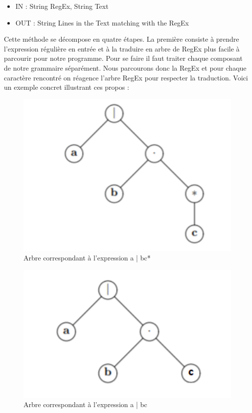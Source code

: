 \documentclass{article}
\begin{document}
\begin{itemize}
\item IN : String RegEx, String Text
\item OUT : String Lines in the Text matching with the RegEx\\
\end{itemize}

Cette méthode se décompose en quatre étapes. La première consiste à prendre l’expression régulière en entrée et à la traduire en arbre de RegEx plus facile à parcourir pour notre programme. Pour se faire il faut traiter chaque composant de notre grammaire séparément. Nous parcourons donc la RegEx et pour chaque caractère
rencontré on réagence l’arbre RegEx pour respecter la traduction. Voici un exemple concret illustrant ces propos :

\begin{figure}[!h]
  \centering
  \includegraphics[width=.3\paperwidth]{abc*.png}
  \caption{Arbre correspondant à l’expression a | bc*}
\end{figure}

\begin{figure}[!h]
  \centering
  \includegraphics[width=.3\paperwidth]{abc.png}
  \caption{Arbre correspondant à l’expression a | bc}
\end{figure}
\end{document}
